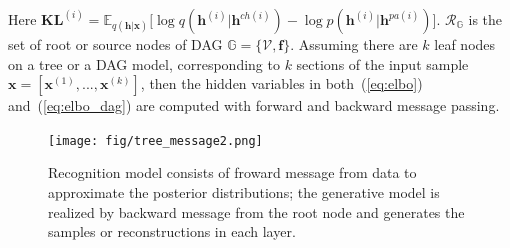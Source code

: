 \documentclass[sigconf, anonymous, review]{acmart}
\theoremstyle{plain}
\theoremstyle{definition}
\theoremstyle{remark}
\begin{document}
\noindent Here $\mathbf{KL}^{(i)}=\mathbb{E}_{q(\mathbf{h}|\mathbf{x})}\big[  \log q(\mathbf{h}^{(i)}|\mathbf{h}^{ch(i)})   - \log p(\mathbf{h}^{(i)}|\mathbf{h}^{pa(i)}) \big]$.  $\mathcal{R}_{ \mathbb{G}}$ is the set of root or source nodes of DAG $\mathbb{G} = \{\mathcal{V}, \mathbf{f}\}$. Assuming there are $k$ leaf nodes on a tree or a DAG model, corresponding to $k$ sections of the input sample $\mathbf{x} = [\mathbf{x}^{(1)}, ..., \mathbf{x}^{(k)}]$, then the hidden variables in both~(\ref{eq:elbo}) and~(\ref{eq:elbo_dag}) are computed with forward and backward message passing. 


\begin{figure}[H]
\begin{center}
 \texttt{[image: fig/tree\_message2.png]}
\end{center}
\vspace{-0.2in}
\caption{Recognition model consists of froward message from  data to approximate the posterior distributions; the generative model is realized by backward message from the root node and generates the samples or reconstructions in each layer.}
\label{fig:tree_message}
\vspace{-0.1in}
\end{figure}




\vspace{-0.05in}
\end{document}
